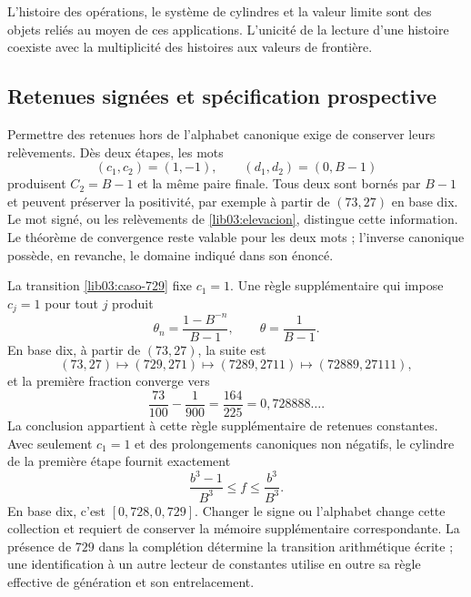 L'histoire des opérations, le système de cylindres et la valeur limite sont des objets reliés au moyen de ces applications. L'unicité de la lecture d'une histoire coexiste avec la multiplicité des histoires aux valeurs de frontière.

\subsection{Retenues signées et spécification prospective}
\label{lib03:firmados}

Permettre des retenues hors de l’alphabet canonique exige de conserver leurs
relèvements. Dès deux étapes, les mots
\[
 (c_1,c_2)=(1,-1),\qquad(d_1,d_2)=(0,B-1)
\]
produisent \(C_2=B-1\) et la même paire finale. Tous deux sont bornés par
\(B-1\) et peuvent préserver la positivité, par exemple à partir de
\((73,27)\) en base dix. Le mot signé, ou les relèvements de
\eqref{lib03:elevacion}, distingue cette information. Le théorème de
convergence reste valable pour les deux mots ; l’inverse canonique
possède, en revanche, le domaine indiqué dans son énoncé.

La transition \eqref{lib03:caso-729} fixe \(c_1=1\). Une règle supplémentaire qui impose \(c_j=1\) pour tout \(j\) produit
\begin{equation}
 \theta_n=\frac{1-B^{-n}}{B-1},\qquad
 \theta=\frac1{B-1}.
 \label{lib03:acarreo-constante}
\end{equation}
En base dix, à partir de \((73,27)\), la suite est
\[
 (73,27)\longmapsto(729,271)\longmapsto(7289,2711)
 \longmapsto(72889,27111),
\]
et la première fraction converge vers
\begin{equation}
 \frac{73}{100}-\frac1{900}=\frac{164}{225}
 =0{,}728888\ldots.
 \label{lib03:limite-constante}
\end{equation}
La conclusion appartient à cette règle supplémentaire de retenues constantes. Avec seulement \(c_1=1\) et des prolongements canoniques non négatifs, le cylindre de la première étape fournit exactement
\begin{equation}
 \frac{b^3-1}{B^3}\leq f\leq\frac{b^3}{B^3}.
 \label{lib03:primer-cilindro}
\end{equation}
En base dix, c’est \([0{,}728,0{,}729]\). Changer le signe ou l’alphabet
change cette collection et requiert de conserver la mémoire supplémentaire
correspondante. La présence de \(729\) dans la complétion détermine
la transition arithmétique écrite ; une identification à un autre lecteur de
constantes utilise en outre sa règle effective de génération et son
entrelacement.


